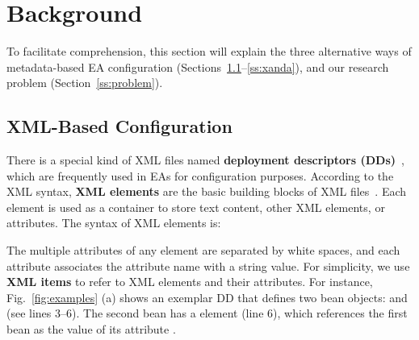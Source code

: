 \vspace{-1.em}
\section{Background}\label{se:background}

To facilitate comprehension, 
this section will explain the three alternative ways of metadata-based EA configuration (Sections~\ref{ss:xml}--\ref{ss:xanda}), and our research problem
(Section~\ref{ss:problem}).

\vspace{-0.5em}
\subsection{XML-Based 
Configuration}\label{ss:xml}
There is a special kind of XML files named \textbf{deployment descriptors (DDs)}~\cite{DD_javaEE}, which are frequently used in EAs for configuration purposes. According to the XML syntax, 
\textbf{XML elements} are the basic building blocks of XML files~\cite{xml-elements}. %
Each element is used as a container to store text content, other XML elements, or attributes. The syntax of XML elements is:


\noindent 
The multiple attributes of any element are separated by white spaces, and each attribute associates the attribute name with a string value. For simplicity, we use \textbf{XML items} to refer to XML elements and their attributes.
For instance, Fig.~\ref{fig:examples} (a)  shows an exemplar DD that defines two bean objects:  and  (see lines 3--6). The second bean has a  element (line 6), which references the first bean as the value of its attribute . %

